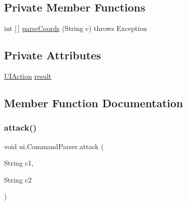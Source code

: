 \subsection*{Private Member Functions}
\begin{DoxyCompactItemize}
\item 
int \mbox{[}$\,$\mbox{]} \mbox{\hyperlink{classui_1_1_command_parser_a6fe407cb1b5f88c583f4797de79fd98f}{parse\+Coords}} (String c)  throws Exception 
\end{DoxyCompactItemize}
\subsection*{Private Attributes}
\begin{DoxyCompactItemize}
\item 
\mbox{\hyperlink{classui_1_1_u_i_action}{U\+I\+Action}} \mbox{\hyperlink{classui_1_1_command_parser_a9c3ed16be5749302a44b7d15a7c860a7}{result}}
\end{DoxyCompactItemize}


\subsection{Member Function Documentation}
\mbox{\label{classui_1_1_command_parser_a84493d28cdfdab457eec5bfeebaf7350}} 
\subsubsection{\texorpdfstring{attack()}{attack()}}
{\footnotesize\ttfamily void ui.\+Command\+Parser.\+attack (\begin{DoxyParamCaption}\item[{String}]{c1,  }\item[{String}]{c2 }\end{DoxyParamCaption})\hspace{0.3cm}{\ttfamily [inline]}}

